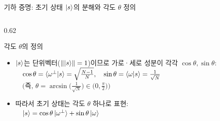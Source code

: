 \documentclass[aspectratio=169, 10pt]{beamer}
\begin{document}
\begin{frame}{기하 증명: 초기 상태 $|s\rangle$의 분해와 각도 $\theta$ 정의}
\begin{columns}[c]
\begin{column}{0.62\textwidth}
\begin{qctip}{각도 $\theta$의 정의}
{                \begin{itemize}\setlength{\itemsep}{1pt}
                    \item $|s\rangle$는 단위벡터($\||s\rangle\|=1$)이므로 가로·세로 성분이 각각 $\cos\theta, \sin\theta$:\\[2pt]
                    $\quad\cos\theta = \langle\omega^\perp|s\rangle = \sqrt{\frac{N-1}{N}}, \quad \sin\theta = \langle\omega|s\rangle = \frac{1}{\sqrt{N}}$\\[2pt]
                    $\quad\big(\text{즉, }\theta = \arcsin\!\big(\frac{1}{\sqrt{N}}\big) \in \big(0, \frac{\pi}{2}\big)\big)$
                    \pause
                    \item 따라서 초기 상태는 각도 $\theta$ 하나로 표현:\\[2pt]
                    $\quad|s\rangle = \cos\theta\,|\omega^\perp\rangle + \sin\theta\,|\omega\rangle$
                \end{itemize}
                }
            \end{qctip}
        \end{column}
    \end{columns}
\end{frame}
\end{document}
